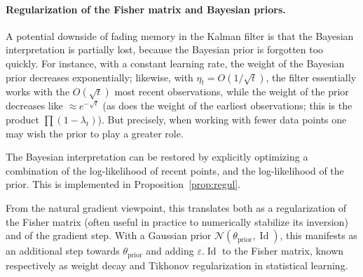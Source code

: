 \documentclass[11pt,a4paper]{article}
\def\eps{\varepsilon}
\DeclareMathOperator{\Id}{Id}
\newcommand{\1}{\mathbbm{1}}
\theoremstyle{yannthm}
\theoremstyle{yannthm2}
\newcommand{\gaussian}{\mathcal{N}}
\numberwithin{equation}{section}
\begin{document}

\paragraph*{Regularization of the Fisher matrix and Bayesian priors.} A
potential downside of fading memory in the Kalman filter is that
the Bayesian interpretation is partially lost,
because the Bayesian prior is forgotten too
quickly. For instance, with a constant learning rate, the weight of the
Bayesian prior decreases exponentially; likewise, with $\eta_t=O(1/\sqrt{t})$, the filter
essentially works with the $O(\sqrt{t})$ most recent observations, while
the weight of the prior decreases like $\approx
e^{-\sqrt{t}}$ (as does the weight of the earliest observations; this is
the product $\prod (1-\lambda_t)$).  But
precisely,
when working with fewer data points one may wish the prior to
play a greater role.

The Bayesian interpretation can be restored by explicitly optimizing a
combination of the log-likelihood of recent points, and the
log-likelihood of the prior. This is implemented in
Proposition~\ref{prop:regul}.

From the natural gradient viewpoint, this translates both as a
regularization of the Fisher matrix (often useful in practice to
numerically stabilize its inversion) and of the gradient step. With a
Gaussian prior $\gaussian(\theta_{\mathrm{prior}},\Id)$, this manifests
as an additional step towards $\theta_\mathrm{prior}$ and adding
$\eps.\Id$ to the Fisher matrix, known respectively as weight decay and
Tikhonov regularization \cite[\S3.3, \S5.5]{Bishop_book} in statistical
learning.
\end{document}
